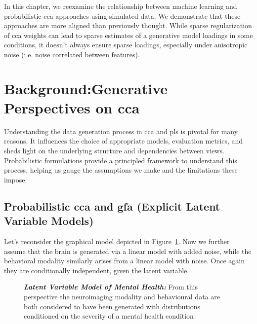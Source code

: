 In this chapter, we reexamine the relationship between machine learning and probabilistic \acrshort{cca} approaches using simulated data.
We demonstrate that these approaches are more aligned than previously thought.
While sparse regularization of \acrshort{cca} weights can lead to sparse estimates of a generative model \gls{loadings} in some conditions, it doesn't always ensure sparse loadings, especially under anisotropic noise (i.e. noise correlated between features).
\newpage
\section{Background:Generative Perspectives on \acrshort{cca}}

Understanding the data generation process in \acrshort{cca} and \acrshort{pls} is pivotal for many reasons.
It influences the choice of appropriate models, evaluation metrics, and sheds light on the underlying structure and dependencies between views.
Probabilistic formulations provide a principled framework to understand this process, helping us gauge the assumptions we make and the limitations these impose.

\subsection{Probabilistic \acrshort{cca} and \acrshort{gfa} (Explicit Latent Variable Models)}\label{subsubsec:a-probabilistic-latent-variable-perspective}

Let's reconsider the graphical model depicted in Figure~\ref{fig:mentalhealthselfsupervisedrepeat}.
Now we further assume that the brain is generated via a linear model with added noise, while the behavioral modality similarly arises from a linear model with noise.
Once again they are conditionally independent, given the latent variable.

\begin{figure}
    \centering
    \caption[Latent Variable Model of Mental Health]{\textit{\textbf{Latent Variable Model of Mental Health:}} From this perspective the neuroimaging modality and behavioural data are both considered to have been generated with distributions conditioned on the severity of a mental health condition}\label{fig:mentalhealthselfsupervisedrepeat}
\end{figure}

